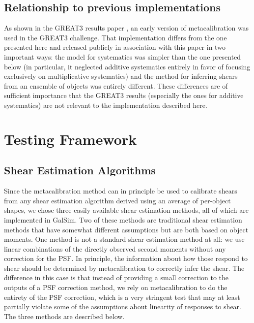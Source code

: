 \documentclass[iop]{emulateapj}
\begin{document}
\subsection{Relationship to previous implementations}

As shown in the GREAT3 results paper \citep{2015MNRAS.450.2963M}, an
early version of metacalibration was used in the GREAT3 challenge.
That implementation differs from the one presented here and released
publicly in association with this paper in two important ways: the
model for systematics was simpler than the one presented below (in
particular, it neglected additive systematics entirely in favor of focusing exclusively on
multiplicative systematics) and the method
for inferring shears from an ensemble of objects was entirely
different.  These differences are of sufficient importance that the
GREAT3 results (especially the ones for additive systematics) are not
relevant to the implementation described here.


\section{Testing Framework}
\label{sec:testing}

\subsection{Shear Estimation Algorithms}

Since the metacalibration method can in principle be used to calibrate
shears from any shear estimation algorithm derived using an average of per-object shapes, we chose three easily
available shear estimation methods, all of which are implemented in
GalSim.  Two of these methods are traditional shear estimation
methods that have somewhat different assumptions but are both based on
object moments.  One method is not a standard shear estimation method
at all: we use linear combinations of the directly observed second
moments without any correction for the PSF.  In principle, the
information about how those respond to shear should be determined by
metacalibration to correctly infer the shear.  The difference in this
case is that instead of providing a small correction to the outputs of
a PSF correction method, we rely on metacalibration to do the entirety
of the PSF correction, which is a very stringent test that may at least 
partially violate some of the assumptions about
linearity of responses to shear.  The three methods are described below.
\end{document}
